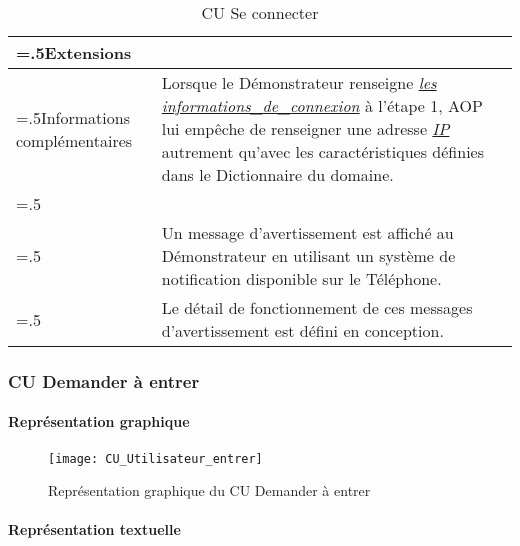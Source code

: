 \newpage
\begin{table}[H]
  \centering
  \begin{tabularx}{\textwidth}{|>{\hsize=.5\hsize}X|>{\hsize=1.5\hsize}X|}
    \hline
    Extensions & \\
    \hline
    Informations complémentaires
    & Lorsque le Démonstrateur renseigne \hyperlink{idc}{\textit{les informations\_de\_connexion}} à l'étape 1, AOP lui empêche de renseigner une adresse \hyperlink{IP}{\textit{IP}} autrement qu'avec les caractéristiques définies dans le Dictionnaire du domaine. \\
    & \\
    & Un message d'avertissement est affiché au Démonstrateur en utilisant un système de notification disponible sur le Téléphone. \\
    & Le détail de fonctionnement de ces messages d'avertissement est défini en conception. \\
    \hline
  \end{tabularx}
  \caption{CU Se connecter}
  \label{tableau-cu-se-connecter}
\end{table}

\subsubsection{CU Demander à entrer}

\paragraph{Représentation graphique}

\begin{figure} [H]
  \centering
  \texttt{[image: CU\_Utilisateur\_entrer]}
  \caption{Représentation graphique du CU Demander à entrer}
  \label{Entrer}
\end{figure}

\paragraph{Représentation textuelle}
\hypertarget{CU_entrer}{}

